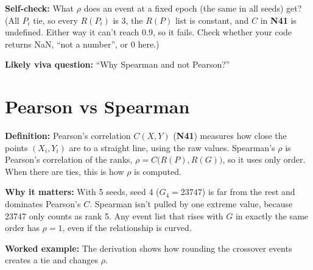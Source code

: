 \documentclass[11pt,a4paper,oneside,openany]{report}
\newcommand{\gl}[1]{\textbf{#1}}   %
\newcommand{\fdef}{\textbf{Definition:} }
\newcommand{\fwhy}{\par\textbf{Why it matters:} }
\newcommand{\fex}{\par\textbf{Worked example:} }
\newcommand{\fself}{\par\textbf{Self-check:} }
\newcommand{\fviva}{\par\textbf{Likely viva question:} }
\begin{document}
\fself What $\rho$ does an event at a fixed epoch (the same in all seeds) get? (All $P_i$ tie, so every $R(P_i)$ is 3, the $R(P)$ list is constant, and $C$ in \gl{N41} is undefined. Either way it can't reach 0.9, so it fails. Check whether your code returns NaN, ``not a number'', or 0 here.)
\fviva ``Why Spearman and not Pearson?''

\section{Pearson vs Spearman}
\fdef Pearson's correlation $C(X, Y)$ (\gl{N41}) measures how close the points $(X_i, Y_i)$ are to a straight line, using the raw values. Spearman's $\rho$ is Pearson's correlation of the ranks, $\rho = C\big(R(P), R(G)\big)$, so it uses only order. When there are ties, this is how $\rho$ is computed.
\fwhy With 5 seeds, seed 4 ($G_4 = 23747$) is far from the rest and dominates Pearson's $C$. Spearman isn't pulled by one extreme value, because 23747 only counts as rank 5. Any event list that rises with $G$ in exactly the same order has $\rho = 1$, even if the relationship is curved.
\fex The derivation shows how rounding the crossover events creates a tie and changes $\rho$.
\end{document}
